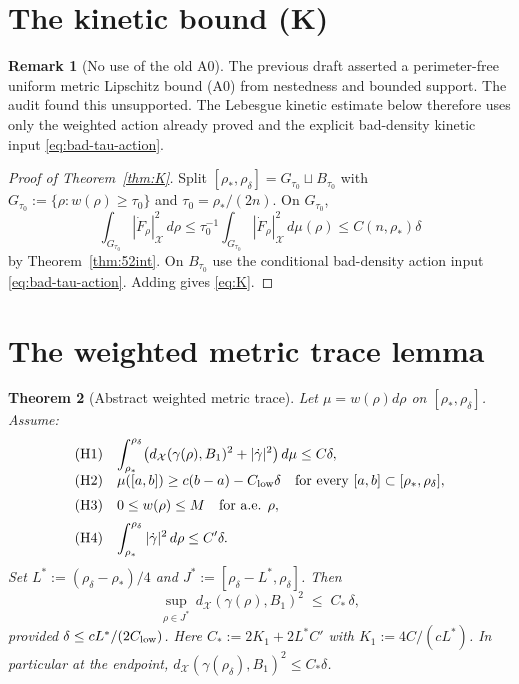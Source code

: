 \documentclass[11pt]{article}
\newtheorem{theorem}{Theorem}[section]
\theoremstyle{definition}
\newtheorem{remark}[theorem]{Remark}
\newcommand{\rstar}{\rho_{*}}
\newcommand{\X}{\mathcal X}
\begin{document}
\section{The kinetic bound (K)}\label{sec:K}

\begin{remark}[No use of the old A0]\label{rem:no-A0}
The previous draft asserted a perimeter-free uniform metric Lipschitz
bound (A0) from nestedness and bounded support.  The audit found this
unsupported.  The Lebesgue kinetic estimate below therefore uses only
the weighted action already proved and the explicit bad-density kinetic
input \eqref{eq:bad-tau-action}.
\end{remark}

\begin{proof}[Proof of Theorem~\ref{thm:K}]
Split $[\rstar,\rho_\delta]=G_{\tau_0}\sqcup B_{\tau_0}$ with
$G_{\tau_0}:=\{\rho:w(\rho)\ge\tau_0\}$ and
$\tau_0=\rstar/(2n)$.  On $G_{\tau_0}$,
\[
   \int_{G_{\tau_0}}|\dot F_\rho|_\X^2\,d\rho
   \le\tau_0^{-1}\int_{G_{\tau_0}}|\dot F_\rho|_\X^2\,d\mu(\rho)
   \le C(n,\rstar)\delta
\]
by Theorem~\ref{thm:52int}.  On $B_{\tau_0}$ use the conditional
bad-density action input \eqref{eq:bad-tau-action}.
Adding gives \eqref{eq:K}.
\end{proof}

\section{The weighted metric trace lemma}\label{sec:agent4}

\begin{theorem}[Abstract weighted metric trace]\label{thm:abstract-trace}
Let $\mu=w(\rho)d\rho$ on $[\rstar,\rho_\delta]$.  Assume:
\[
\begin{array}{ll}
\mathrm{(H1)}&
   \displaystyle \int_{\rstar}^{\rho_\delta}
      \bigl(d_\X(\gamma(\rho),B_1)^2+|\dot\gamma|^2\bigr)\,d\mu
      \le C\delta,\\[2mm]
\mathrm{(H2)}&
   \displaystyle \mu([a,b])\ge c(b-a)-C_{\rm low}\delta
      \quad\text{for every }[a,b]\subset[\rstar,\rho_\delta],\\[2mm]
\mathrm{(H3)}&
   \displaystyle 0\le w(\rho)\le M
      \quad\text{for a.e. }\rho,\\[2mm]
\mathrm{(H4)}&
   \displaystyle \int_{\rstar}^{\rho_\delta}|\dot\gamma|^2\,d\rho
      \le C'\delta .
\end{array}
\]
Set
$L^*:=(\rho_\delta-\rstar)/4$ and $J^*:=[\rho_\delta-L^*,\rho_\delta]$.
Then
\[
   \sup_{\rho\in J^*}\,d_\X(\gamma(\rho),B_1)^2\;\le\;C_*\,\delta,
\]
provided $\delta\le cL^*/(2C_{\rm low})$.  Here
$C_*:=2K_1+2L^*C'$ with $K_1:=4C/(cL^*)$. In particular at the
endpoint, $d_\X(\gamma(\rho_\delta),B_1)^2\le C_*\delta$.
\end{theorem}
\end{document}

